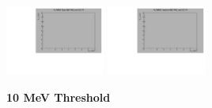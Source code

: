 \begin{center}
  \includegraphics[width=0.245\textwidth]{plots/response_matrix/Total_FHC_CC1Pi_null.pdf}
  \includegraphics[width=0.245\textwidth]{plots/response_matrix/Hadrons_FHC_CC1Pi_null.pdf}

\end{center}

\textbf{10 MeV Threshold}

